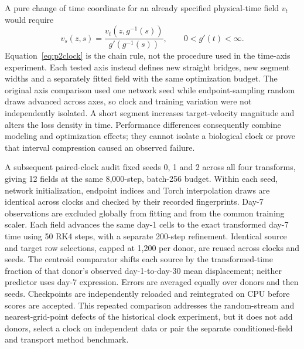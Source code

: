 \documentclass[10pt,a4paper]{article}
\begin{document}
A pure change of time coordinate for an already specified physical-time field $v_t$ would require
\begin{equation}
v_s(z,s)=\frac{v_t(z,g^{-1}(s))}{g'(g^{-1}(s))},\qquad 0<g'(t)<\infty.\label{eq:p2clock}
\end{equation}
Equation~\eqref{eq:p2clock} is the chain rule, not the procedure used in the time-axis experiment. Each tested axis instead defines new straight bridges, new segment widths and a separately fitted field with the same optimization budget. The original axis comparison used one network seed while endpoint-sampling random draws advanced across axes, so clock and training variation were not independently isolated. A short segment increases target-velocity magnitude and alters the loss density in time. Performance differences consequently combine modeling and optimization effects; they cannot isolate a biological clock or prove that interval compression caused an observed failure.

A subsequent paired-clock audit fixed seeds 0, 1 and 2 across all four transforms, giving 12 fields at the same 8,000-step, batch-256 budget. Within each seed, network initialization, endpoint indices and Torch interpolation draws are identical across clocks and checked by their recorded fingerprints. Day-7 observations are excluded globally from fitting and from the common training scaler. Each field advances the same day-1 cells to the exact transformed day-7 time using 50 RK4 steps, with a separate 200-step refinement. Identical source and target row selections, capped at 1,200 per donor, are reused across clocks and seeds. The centroid comparator shifts each source by the transformed-time fraction of that donor's observed day-1-to-day-30 mean displacement; neither predictor uses day-7 expression. Errors are averaged equally over donors and then seeds. Checkpoints are independently reloaded and reintegrated on CPU before scores are accepted. This repeated comparison addresses the random-stream and nearest-grid-point defects of the historical clock experiment, but it does not add donors, select a clock on independent data or pair the separate conditioned-field and transport method benchmark.
\end{document}
